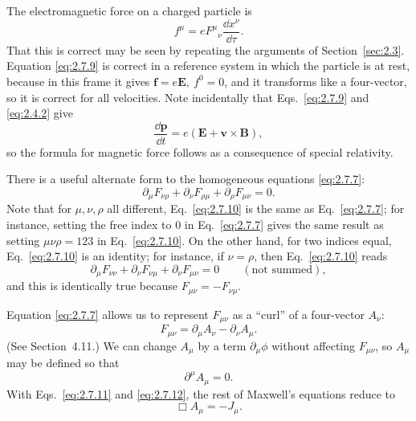 The electromagnetic force on a charged particle is
\begin{equation}
  f^\mu=eF^\mu{}_\nu\frac{\dd x^\nu}{\dd\tau}.
  \tag{2.7.9}\label{eq:2.7.9}
\end{equation}
That this is correct may be seen by repeating the arguments of
Section~\ref{sec:2.3}. Equation \eqref{eq:2.7.9} is correct in a reference
system in which the particle is at rest, because in this frame it gives
\(\mathbf f=e\mathbf E,\ f^0=0\), and it transforms like a four-vector, so it
is correct for all velocities. Note incidentally that Eqs.~\eqref{eq:2.7.9}
and \eqref{eq:2.4.2} give
\[
  \frac{\dd\mathbf p}{\dd t}
  =e(\mathbf E+\mathbf v\times\mathbf B),
\]
so the formula for magnetic force follows as a consequence of special
relativity.

There is a useful alternate form to the homogeneous equations
\eqref{eq:2.7.7}:
\begin{equation}
  \partial_\mu F_{\nu\rho}
  +\partial_\nu F_{\rho\mu}
  +\partial_\rho F_{\mu\nu}=0 .
  \tag{2.7.10}\label{eq:2.7.10}
\end{equation}
Note that for \(\mu,\nu,\rho\) all different, Eq.~\eqref{eq:2.7.10} is the
same as Eq.~\eqref{eq:2.7.7}; for instance, setting the free index to \(0\) in
Eq.~\eqref{eq:2.7.7} gives the same result as setting
\(\mu\nu\rho=123\) in Eq.~\eqref{eq:2.7.10}. On the other hand, for two
indices equal, Eq.~\eqref{eq:2.7.10} is an identity; for instance, if
\(\nu=\rho\), then Eq.~\eqref{eq:2.7.10} reads
\[
  \partial_\mu F_{\nu\nu}
  +\partial_\nu F_{\nu\mu}
  +\partial_\nu F_{\mu\nu}=0
  \qquad(\text{not summed}),
\]
and this is identically true because \(F_{\mu\nu}=-F_{\nu\mu}\).

Equation \eqref{eq:2.7.7} allows us to represent \(F_{\mu\nu}\) as a
``curl'' of a four-vector \(A_\nu\):
\begin{equation}
  F_{\mu\nu}=\partial_\mu A_\nu-\partial_\nu A_\mu .
  \tag{2.7.11}\label{eq:2.7.11}
\end{equation}
(See Section~4.11.) We can change \(A_\mu\) by a term
\(\partial_\mu\phi\) without affecting \(F_{\mu\nu}\), so \(A_\mu\) may be
defined so that
\begin{equation}
  \partial^\mu A_\mu=0 .
  \tag{2.7.12}\label{eq:2.7.12}
\end{equation}
With Eqs.~\eqref{eq:2.7.11} and \eqref{eq:2.7.12}, the rest of Maxwell's
equations reduce to
\begin{equation}
  \Box A_\mu=-J_\mu .
  \tag{2.7.13}\label{eq:2.7.13}
\end{equation}
